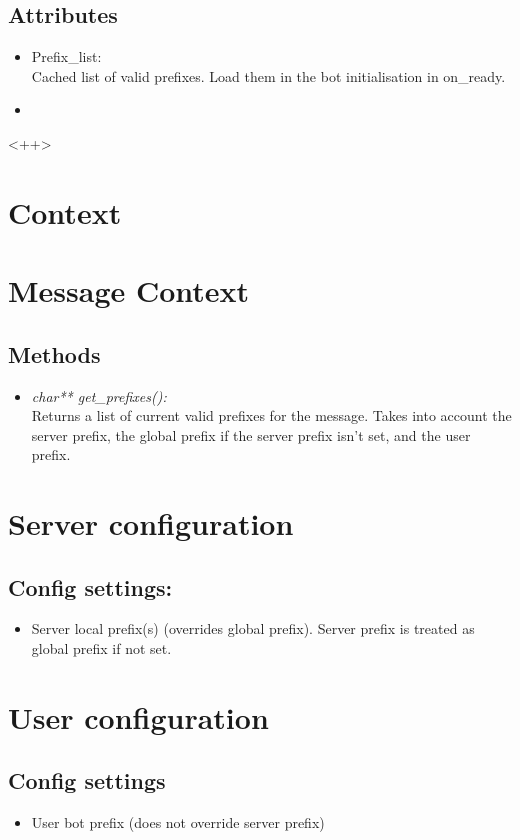 \documentclass[a4paper]{amsart}
\begin{document}
\subsection{Attributes}
    \begin{itemize}
        \item Prefix\_list:\\
            Cached list of valid prefixes. Load them in the bot initialisation in on\_ready.
        \item 
    \end{itemize}<++>

\section{Context}
\section{Message Context}
\subsection{Methods}
    \begin{itemize}
        \item \textit{char** get\_prefixes():}\\
            Returns a list of current valid prefixes for the message. Takes into account the server prefix, the global prefix if the server prefix isn't set, and the user prefix.
    \end{itemize}

\section{Server configuration}
\subsection{Config settings:}
\begin{itemize}
    \item Server local prefix(s) (overrides global prefix). Server prefix is treated as global prefix if not set.
\end{itemize}

\section{User configuration}
\subsection{Config settings}
\begin{itemize}
    \item User bot prefix (does not override server prefix)
\end{itemize}
\end{document}
